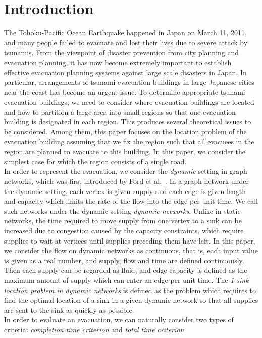 \documentclass[a4paper]{llncs}
\begin{document}
\section{Introduction}
The Tohoku-Pacific Ocean Earthquake happened in Japan on March 11, 2011, 
and many people failed to evacuate and lost their lives due to severe attack by tsunamis. 
From the viewpoint of disaster prevention from city planning and evacuation planning,  
it has now become extremely important to establish effective evacuation planning systems against large scale disasters in Japan. 
In particular, arrangements of tsunami evacuation buildings in large Japanese cities near the coast has become an urgent issue. 
To determine appropriate tsunami evacuation buildings, we need to consider where evacuation buildings are located 
and how to partition a large area into small regions so that one evacuation building is designated in each region. 
This produces several theoretical issues to be considered. 
Among them, this paper focuses on the location problem of the evacuation building assuming that we fix the region such that all evacuees in the region are planned to evacuate to this building. 
In this paper, we consider the simplest case for which the region consists of a single road. \\
\indent
In order to represent the evacuation, we consider the {\it dynamic} setting in graph networks, which was first introduced by Ford et al.~\cite{ff58}.
In a graph network under the dynamic setting, each vertex is given supply and each edge is given length and capacity which limits the rate of the flow into the edge per unit time.
We call such networks under the dynamic setting {\it dynamic networks}.
Unlike in static networks, the time required to move supply from one vertex to a sink can be increased due to congestion caused by the capacity constraints, 
which require supplies to wait at vertices until supplies preceding them have left.
In this paper, we consider the flow on dynamic networks as continuous, that is, each input value is given as a real number, and supply, flow and time are defined continuously.
Then each supply can be regarded as fluid, and edge capacity is defined as the maximum amount of supply which can enter an edge per unit time.
The {\it 1-sink location problem in dynamic networks} is defined as the problem which requires to find the optimal location of a sink in a given dynamic network 
so that all supplies are sent to the sink as quickly as possible. \\
\indent
In order to evaluate an evacuation, we can naturally consider two types of criteria: {\it completion time criterion} and {\it total time criterion}.
\end{document}
